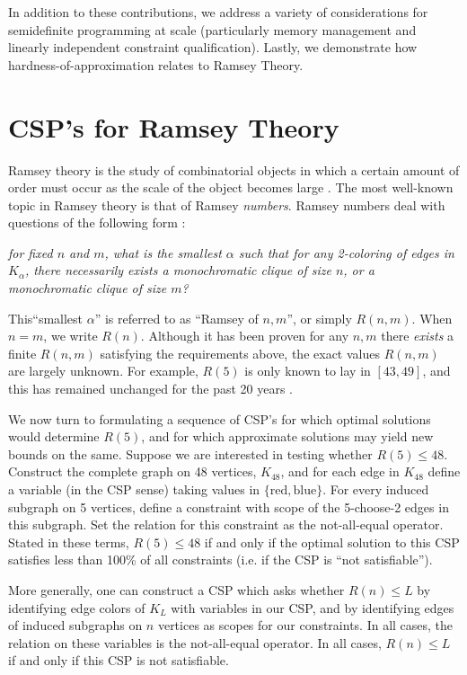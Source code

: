 \documentclass[12pt]{article} %
\begin{document}
In addition to these contributions, we address a variety of considerations for semidefinite programming at scale (particularly memory management and linearly independent constraint qualification). Lastly, we demonstrate how hardness-of-approximation relates to Ramsey Theory.


\section{CSP's for Ramsey Theory}
Ramsey theory is the study of combinatorial objects in which a certain amount of order must occur as the scale of the object becomes large \cite{rt}. The most well-known topic in Ramsey theory is that of Ramsey \textit{numbers}. Ramsey numbers deal with questions of the following form : 

\vspace{1em}
\noindent \textit{for fixed $n$ and $m$, what is the smallest $\alpha$ such that for \textit{any} 2-coloring of edges in $K_\alpha$, there necessarily exists a monochromatic clique of size $n$, or a monochromatic clique of size $m$?}
\vspace{1em}

This``smallest $\alpha$'' is referred to as ``Ramsey of $n,m$'', or simply $R(n,m)$. When $n = m$, we write $R(n)$. Although it has been proven for any $n,m$ there \textit{exists} a finite $R(n,m)$ satisfying the requirements above, the exact values $R(n,m)$ are largely unknown. For example, $R(5)$ is only known to lay in $[43,49]$, and this has remained unchanged for the past 20 years \cite{rn}. 

We now turn to formulating a sequence of CSP's for which optimal solutions would determine $R(5)$, and for which approximate solutions may yield new bounds on the same. Suppose we are interested in testing whether $R(5) \leq 48$. Construct the complete graph on 48 vertices, $K_{48}$, and for each edge in $K_{48}$ define a variable (in the CSP sense) taking values in $\{\text{red},\text{blue}\}$. For every induced subgraph on 5 vertices, define a constraint with scope of the 5-choose-2 edges in this subgraph. Set the relation for this constraint as the not-all-equal operator. Stated in these terms, $R(5) \leq 48$ if and only if the optimal solution to this CSP satisfies less than 100\% of all constraints (i.e. if the CSP is ``not satisfiable'').

More generally, one can construct a CSP which asks whether $R(n) \leq L$ by identifying edge colors of $K_L$ with variables in our CSP, and by identifying edges of induced subgraphs on $n$ vertices as scopes for our constraints. In all cases, the relation on these variables is the not-all-equal operator. In all cases, $R(n) \leq L$ if and only if this CSP is not satisfiable.
\end{document}
